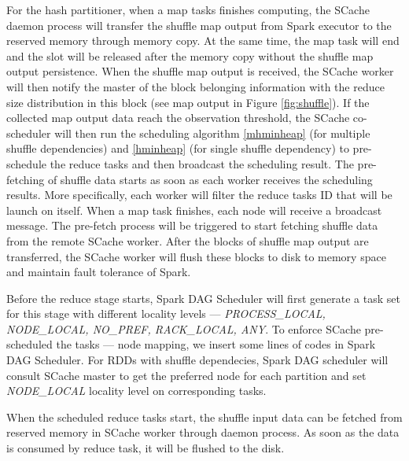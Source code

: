For the hash partitioner, when a map tasks finishes computing, the SCache daemon process will transfer the shuffle map output from Spark executor to the reserved memory through memory copy. 
At the same time, the map task will end and the slot will be released after the memory copy without the shuffle map output persistence. 
When the shuffle map output is received, the SCache worker will then notify the master of the block belonging information with the reduce size distribution in this block (see map output in Figure \ref{fig:shuffle}). 
If the collected map output data reach the observation threshold, the SCache co-scheduler will then run the scheduling algorithm \ref{mhminheap} (for multiple shuffle dependencies) and \ref{hminheap} (for single shuffle dependency) to pre-schedule the reduce tasks and then broadcast the scheduling result.
The pre-fetching of shuffle data starts as soon as each worker receives the scheduling results. 
More specifically, each worker will filter the reduce tasks ID that will be launch on itself. 
When a map task finishes, each node will receive a broadcast message. The pre-fetch process will be triggered to start fetching shuffle data from the remote SCache worker. After the blocks of shuffle map output are transferred, the SCache worker will flush these blocks to disk to memory space and maintain fault tolerance of Spark. 

Before the reduce stage starts, Spark DAG Scheduler will first generate a task set for this stage with different locality levels --- \textit{PROCESS\_LOCAL, NODE\_LOCAL, NO\_PREF, RACK\_LOCAL, ANY}.
To enforce SCache pre-scheduled the tasks --- node mapping, we insert some lines of codes in Spark DAG Scheduler.
For RDDs with shuffle dependecies, Spark DAG scheduler will consult SCache master to get the preferred node for each partition and set \textit{NODE\_LOCAL} locality level on corresponding tasks. 

When the scheduled reduce tasks start, the shuffle input data can be fetched from reserved memory in SCache worker through daemon process. As soon as the data is consumed by reduce task, it will be flushed to the disk.

